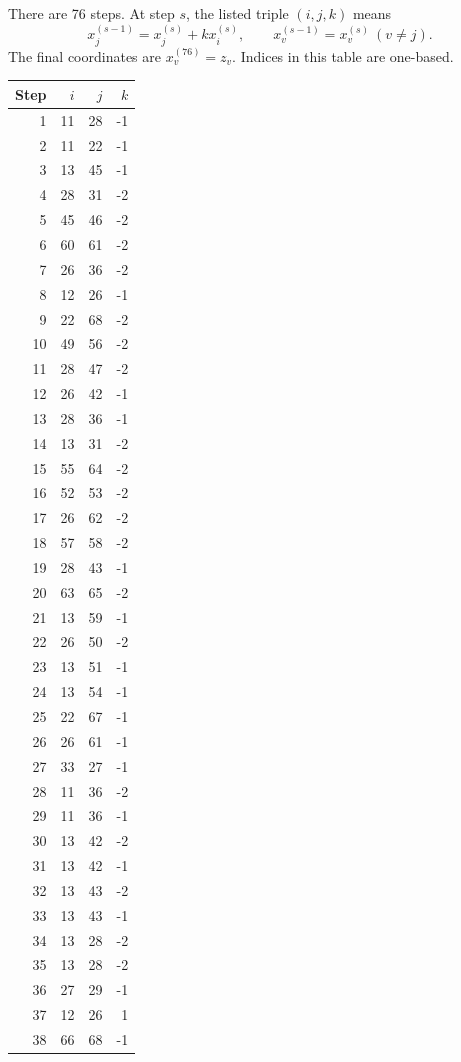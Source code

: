 There are 76 steps. At step $s$, the listed triple $(i,j,k)$ means
\[x^{(s-1)}_j=x^{(s)}_j+kx^{(s)}_i,\qquad x^{(s-1)}_v=x^{(s)}_v\ (v\ne j).\]
The final coordinates are $x^{(76)}_v=z_v$. Indices in this table are one-based.
\begin{center}
\begin{minipage}[t]{.46\linewidth}\centering
\begin{tabular}{rrrr}
\toprule Step & $i$ & $j$ & $k$\\\midrule
1&11&28&-1\\
2&11&22&-1\\
3&13&45&-1\\
4&28&31&-2\\
5&45&46&-2\\
6&60&61&-2\\
7&26&36&-2\\
8&12&26&-1\\
9&22&68&-2\\
10&49&56&-2\\
11&28&47&-2\\
12&26&42&-1\\
13&28&36&-1\\
14&13&31&-2\\
15&55&64&-2\\
16&52&53&-2\\
17&26&62&-2\\
18&57&58&-2\\
19&28&43&-1\\
20&63&65&-2\\
21&13&59&-1\\
22&26&50&-2\\
23&13&51&-1\\
24&13&54&-1\\
25&22&67&-1\\
26&26&61&-1\\
27&33&27&-1\\
28&11&36&-2\\
29&11&36&-1\\
30&13&42&-2\\
31&13&42&-1\\
32&13&43&-2\\
33&13&43&-1\\
34&13&28&-2\\
35&13&28&-2\\
36&27&29&-1\\
37&12&26&1\\
38&66&68&-1\\
\bottomrule\end{tabular}\end{minipage}

\end{center}
